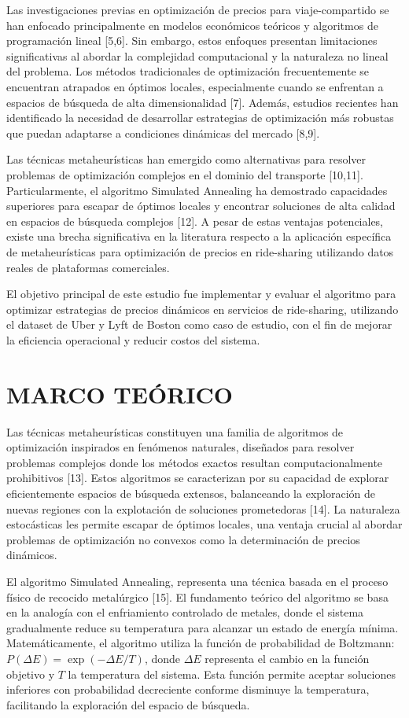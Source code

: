 \documentclass[conference]{IEEEtran}
\begin{document}
Las investigaciones previas en optimización de precios para viaje-compartido se han enfocado principalmente en modelos económicos teóricos y algoritmos de programación lineal [5,6]. Sin embargo, estos enfoques presentan limitaciones significativas al abordar la complejidad computacional y la naturaleza no lineal del problema. Los métodos tradicionales de optimización frecuentemente se encuentran atrapados en óptimos locales, especialmente cuando se enfrentan a espacios de búsqueda de alta dimensionalidad [7]. Además, estudios recientes han identificado la necesidad de desarrollar estrategias de optimización más robustas que puedan adaptarse a condiciones dinámicas del mercado [8,9].

Las técnicas metaheurísticas han emergido como alternativas para resolver problemas de optimización complejos en el dominio del transporte [10,11]. Particularmente, el algoritmo Simulated Annealing ha demostrado capacidades superiores para escapar de óptimos locales y encontrar soluciones de alta calidad en espacios de búsqueda complejos [12]. A pesar de estas ventajas potenciales, existe una brecha significativa en la literatura respecto a la aplicación específica de metaheurísticas para optimización de precios en ride-sharing utilizando datos reales de plataformas comerciales.

El objetivo principal de este estudio fue implementar y evaluar el algoritmo para optimizar estrategias de precios dinámicos en servicios de ride-sharing, utilizando el dataset de Uber y Lyft de Boston como caso de estudio, con el fin de mejorar la eficiencia operacional y reducir costos del sistema.

\section{MARCO TEÓRICO}

Las técnicas metaheurísticas constituyen una familia de algoritmos de optimización inspirados en fenómenos naturales, diseñados para resolver problemas complejos donde los métodos exactos resultan computacionalmente prohibitivos [13]. Estos algoritmos se caracterizan por su capacidad de explorar eficientemente espacios de búsqueda extensos, balanceando la exploración de nuevas regiones con la explotación de soluciones prometedoras [14]. La naturaleza estocásticas les permite escapar de óptimos locales, una ventaja crucial al abordar problemas de optimización no convexos como la determinación de precios dinámicos.

El algoritmo Simulated Annealing, representa una técnica basada en el proceso físico de recocido metalúrgico [15]. El fundamento teórico del algoritmo se basa en la analogía con el enfriamiento controlado de metales, donde el sistema gradualmente reduce su temperatura para alcanzar un estado de energía mínima. Matemáticamente, el algoritmo utiliza la función de probabilidad de Boltzmann: $P(\Delta E) = \exp(-\Delta E/T)$, donde $\Delta E$ representa el cambio en la función objetivo y $T$ la temperatura del sistema. Esta función permite aceptar soluciones inferiores con probabilidad decreciente conforme disminuye la temperatura, facilitando la exploración del espacio de búsqueda.
\end{document}
